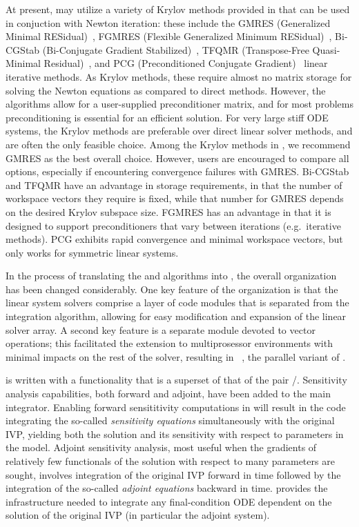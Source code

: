 At present, {\cvode} may utilize a variety of Krylov methods provided
in {\sundials} that can be used in conjuction with Newton iteration:
these include the GMRES (Generalized Minimal RESidual)~\cite{SaSc:86},
FGMRES (Flexible Generalized Minimum RESidual)~\cite{Saa:93},
Bi-CGStab (Bi-Conjugate Gradient Stabilized)~\cite{Van:92}, TFQMR
(Transpose-Free Quasi-Minimal Residual)~\cite{Fre:93}, and PCG
(Preconditioned Conjugate Gradient)~\cite{HeSt:52} linear iterative
methods.  As Krylov methods, these require almost no
matrix storage for solving the Newton equations as compared to direct
methods. However, the algorithms allow for a user-supplied preconditioner
matrix, and for most problems preconditioning is essential for an
efficient solution.
For very large stiff ODE systems, the Krylov methods are preferable over
direct linear solver methods, and are often the only feasible choice.
Among the Krylov methods in {\sundials}, we recommend GMRES as the
best overall choice.  However, users are encouraged to compare all
options, especially if encountering convergence failures with GMRES.
Bi-CGStab and TFQMR have an advantage in storage requirements, in
that the number of workspace vectors they require is fixed, while that
number for GMRES depends on the desired Krylov subspace size.  FGMRES
has an advantage in that it is designed to support preconditioners
that vary between iterations (e.g.~iterative methods).  PCG exhibits
rapid convergence and minimal workspace vectors, but only works for
symmetric linear systems.

In the process of translating the {\vode} and {\vodpk} algorithms into
{\CC}, the overall {\cvode} organization has been changed considerably.
One key feature of the {\cvode} organization is that the linear system
solvers comprise a layer of code modules that is separated from the
integration algorithm, allowing for easy modification and expansion of
the linear solver array.  A second key feature is a separate module
devoted to vector operations; this facilitated the extension to
multiprosessor environments with minimal impacts on the rest of the
solver, resulting in {\pvode}~\cite{ByHi:99},
the parallel variant of {\cvode}.  

{\cvodes} is written with a functionality that is a superset of that
of the pair {\cvode}/{\pvode}. Sensitivity analysis capabilities, both
forward and adjoint, have been added to the main integrator. Enabling
forward sensititivity computations in {\cvodes} will result in the
code integrating the so-called {\em sensitivity equations}
simultaneously with the original IVP, yielding both the solution and
its sensitivity with respect to parameters in the model. Adjoint
sensitivity analysis, most useful when the gradients of relatively few
functionals of the solution with respect to many parameters are
sought, involves integration of the original IVP forward in time
followed by the integration of the so-called {\em adjoint equations}
backward in time. {\cvodes} provides the infrastructure needed to
integrate any final-condition ODE dependent on the solution of the
original IVP (in particular the adjoint system).

